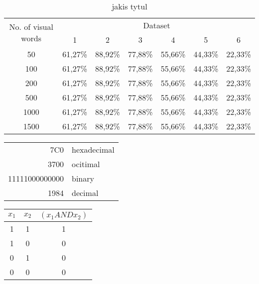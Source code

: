 \documentclass{article}
\begin{document}
\begin{table}
	\centering
		\begin{tabular}{|c|c|c|c|c|c|c|}
	   \hline 
		\multirow{2}{*}{No. of visual words} & \multicolumn{6}{c|}{Dataset} \\ \cline{2-7}
		& 1 & 2 & 3 & 4 & 5 & 6 \\ \hline 
		50 & 61,27\% & 88,92\% & 77,88\% & 55,66\% & 44,33\% & 22,33\% \\ \hline
		100 & 61,27\% & 88,92\% & 77,88\% & 55,66\% & 44,33\% & 22,33\% \\ \hline
		200 & 61,27\% & 88,92\% & 77,88\% & 55,66\% & 44,33\% & 22,33\% \\ \hline
		500 & 61,27\% & 88,92\% & 77,88\% & 55,66\% & 44,33\% & 22,33\% \\ \hline
		1000 & 61,27\% & 88,92\% & 77,88\% & 55,66\% & 44,33\% & 22,33\% \\ \hline
		1500 & 61,27\% & 88,92\% & 77,88\% & 55,66\% & 44,33\% & 22,33\% \\ \hline
		\end{tabular}
	\caption{jakis tytul}
	\label{tab:asd}
\end{table}
	\begin{table}
		\centering
		\begin{tabular}{|r|l|}
		\hline
		7C0 & hexadecimal \\
		3700 & ocitimal \\ \cline{2-2}
		11111000000000 & binary \\ \hline \hline
		1984 & decimal \\
		\hline
			
		\end{tabular}
	\end{table}	
	\begin{table}
		\centering
			\begin{tabular}{c|c|c}
			\hline \hline
			$x_1$ & $x_2$ & $\left(x_1ANDx_2 \right)$ \\ \hline
			1 & 1 & 1 \\
			1 & 0 & 0 \\
			0 & 1 & 0 \\
			0 & 0 & 0 \\
			\hline \hline
				
			\end{tabular}
	\end{table}
\end{document}
